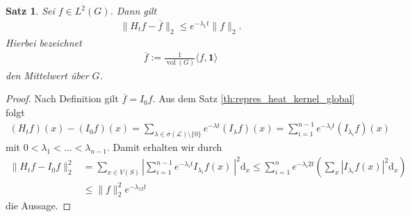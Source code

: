 \documentclass[headsepline,11pt]{scrbook}
\newtheorem{thm}[lem]{Satz}
\theoremstyle{definition}
\DeclareMathOperator{\vol}{vol}
\begin{document}
%

\begin{thm}\label{th:L_2_estimate_global}
	Sei $ f \in L^2(G) $.
	Dann gilt
	\begin{align*}
	\| H_t f - \overline{f}  \|_2 \leq e^{-\lambda_1 t} \| f \|_2. 
	\end{align*}
	Hierbei bezeichnet 
	\begin{align}
	\overline{f} := 
	\frac{1}{\vol(G)} \langle f ,\textbf{1} \rangle
	\end{align}
	den Mittelwert \"uber $ G $.
\end{thm}
\begin{proof}
	Nach Definition gilt $ \overline{f} = I_0 f $.
	Aus dem Satz \ref{th:repres_heat_kernel_global} folgt
	\begin{align*}
	(H_t f)(x) - (I_0 f)(x) = 
	\sum \limits_{\lambda \in \sigma(\mathcal{L}) \setminus \{0\}}
	e^{-\lambda t} (I_\lambda f)(x)
	=
	\sum \limits_{i = 1}^{n-1} e^{-\lambda_i t} (I_{\lambda_i} f)(x)
	\end{align*}
	mit $ 0 < \lambda_1 < ... < \lambda_{n-1} $.
	Damit erhalten wir durch
	\begin{align*}
	\| H_t f - I_0 f  \|_2^2 
	&=
	\sum \limits_{x \in V(S)} \left| 
	\sum \limits_{i=1}^{n-1} e^{-\lambda_i t} I_{\lambda_i} f(x)
	\ \right|^2 \mathrm{d}_x
	\leq
	\sum \limits_{i=1}^n e^{-\lambda_i 2 t}  
	\left(\sum \limits_x | I_{\lambda_i} f(x) |^2 \mathrm{d}_x\right)\\
	&\leq 
	\| f \|_2^2 e^{- \lambda_12  t}
	\end{align*}
	die Aussage.
\end{proof}
\end{document}
